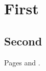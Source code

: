 \documentclass{article}
\begin{document}
\section{First}\label{sec:a}
\subsection{Second}\label{sec:b}
Pages \pageref{sec:a} and \pageref*{sec:b}.
\end{document}
